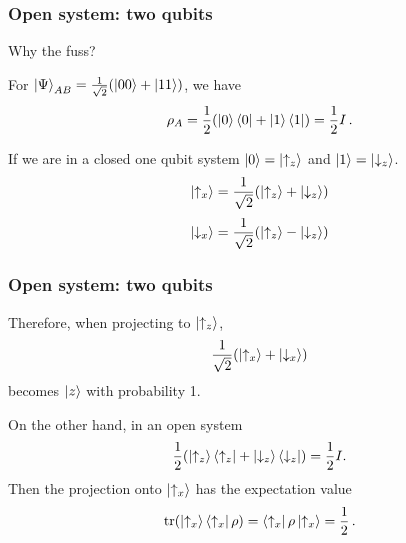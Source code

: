 \documentclass[12pt, aspectratio=169]{beamer}
\begin{document}
\begin{frame}
    \frametitle{Open system: two qubits}
    Why the fuss?

    For $\ket{\Psi}_{AB} = \frac{1}{\sqrt{2}} (\ket{00} + \ket{11})$, we have
    \begin{equation*}
        \rho_A = \frac{1}{2} (\ket{0}\bra{0} + \ket{1}\bra{1}) = \frac{1}{2} I \,.
    \end{equation*}

    If we are in a closed one qubit system
    $\ket{0} = \ket{\uparrow_z}$ and $\ket{1} = \ket{\downarrow_z}$.
    $$\ket{\uparrow_x} = \frac{1}{\sqrt{2}} ( \ket{\uparrow_z} + \ket{\downarrow_z})$$
    $$\ket{\downarrow_x} = \frac{1}{\sqrt{2}} ( \ket{\uparrow_z} - \ket{\downarrow_z})$$
\end{frame}

\begin{frame}
    \frametitle{Open system: two qubits}
    Therefore, when projecting to $\ket{\uparrow_z}$,
    \begin{equation*}
        \frac{1}{\sqrt{2}} (\ket{\uparrow_x} + \ket{\downarrow_x}) 
    \end{equation*}
    becomes $\ket{z}$ with probability 1.

    On the other hand, in an open system
    \begin{equation*}
        \frac{1}{2} (\ket{\uparrow_z}\bra{\uparrow_z} + \ket{\downarrow_z}\bra{\downarrow_z})
        = \frac{1}{2}I.
    \end{equation*}
    Then the projection onto $\ket{\uparrow_x}$ has the expectation value
    \begin{equation*}
        \tr( \ket{\uparrow_x}\bra{\uparrow_x}\rho) = \bra{\uparrow_x }\rho \ket{\uparrow_x} = \frac{1}{2} \,.
    \end{equation*}

\end{frame}


\printbibliography 
%
%
\end{document}
